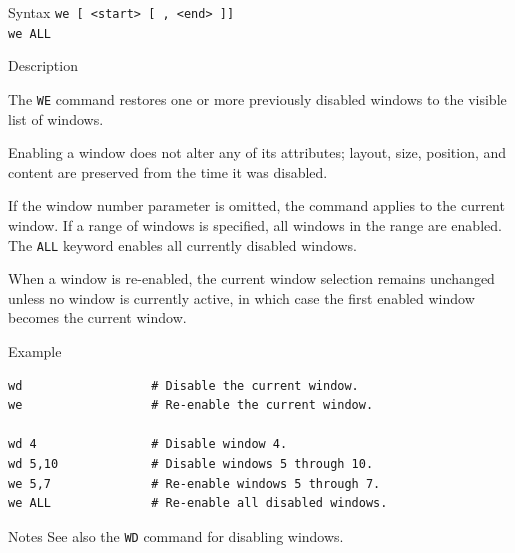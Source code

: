 %
%
\pagebreak
{}

\begin{iPageDescEntry}{Syntax}
\texttt{we [ <start> [ , <end> ]]} \\
\texttt{we ALL} \\
\end{iPageDescEntry}

\begin{iPageDescEntry}{Description}

The \texttt{WE} command restores one or more previously disabled windows to the visible list of windows.

Enabling a window does not alter any of its attributes; layout, size, position, and content are preserved from the time it was disabled.

If the window number parameter is omitted, the command applies to the current window. If a range of windows is specified, all windows in the range are enabled. The \texttt{ALL} keyword enables all currently disabled windows.

When a window is re-enabled, the current window selection remains unchanged unless no window is currently active, in which case the first enabled window becomes the current window.

\end{iPageDescEntry}

\begin{iPageDescOpEntry}{Example}
\begin{lstlisting}[style=iPageOpStyle]
wd                  # Disable the current window.
we                  # Re-enable the current window.

wd 4                # Disable window 4.
wd 5,10             # Disable windows 5 through 10.
we 5,7              # Re-enable windows 5 through 7.
we ALL              # Re-enable all disabled windows.
\end{lstlisting}
\end{iPageDescOpEntry}

\begin{iPageDescEntry}{Notes}
See also the \texttt{WD} command for disabling windows.
\end{iPageDescEntry}
